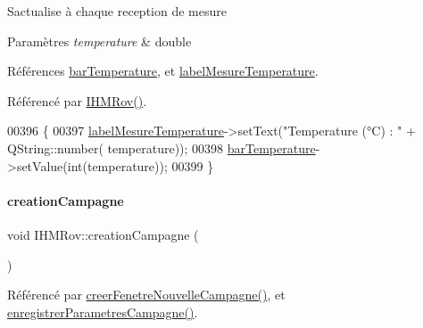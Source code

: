 S\textquotesingle{}actualise à chaque reception de mesure


\begin{DoxyParams}{Paramètres}
{\em temperature} & double \\
\hline
\end{DoxyParams}


Références \hyperlink{class_i_h_m_rov_aa89397963e5889e2f911bed5112772cb}{bar\+Temperature}, et \hyperlink{class_i_h_m_rov_ade64349f20dac7adccee4d4fbc04e6e8}{label\+Mesure\+Temperature}.



Référencé par \hyperlink{class_i_h_m_rov_a5dac1fb4612866cc61f699a415e0ef6b}{I\+H\+M\+Rov()}.


\begin{DoxyCode}
00396 \{
00397     \hyperlink{class_i_h_m_rov_ade64349f20dac7adccee4d4fbc04e6e8}{labelMesureTemperature}->setText(\textcolor{stringliteral}{"Temperature (°C) : "} + QString::number(
      temperature));
00398     \hyperlink{class_i_h_m_rov_aa89397963e5889e2f911bed5112772cb}{barTemperature}->setValue(\textcolor{keywordtype}{int}(temperature)); 
00399 \}
\end{DoxyCode}
\mbox{\label{class_i_h_m_rov_a4a4a90ab6d074aa54466f3f87db2f81c}} 
\paragraph{\texorpdfstring{creation\+Campagne}{creationCampagne}}
{\footnotesize\ttfamily void I\+H\+M\+Rov\+::creation\+Campagne (\begin{DoxyParamCaption}{ }\end{DoxyParamCaption})\hspace{0.3cm}{\ttfamily [signal]}}



Référencé par \hyperlink{class_i_h_m_rov_a08bf623a890df272f738c1ff8631213f}{creer\+Fenetre\+Nouvelle\+Campagne()}, et \hyperlink{class_i_h_m_rov_a229194814bfb1fc94ab3cc86d6411921}{enregistrer\+Parametres\+Campagne()}.

\mbox{\label{class_i_h_m_rov_a30b49bada719a73e0899ad4bafb4de99}} 
